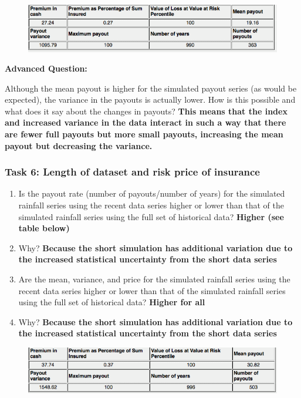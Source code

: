 \documentclass[letterpaper,10pt,english]{sphinxmanual}
\begin{document}
\begin{figure}[htbp]
\centering

\includegraphics{premium2.png}
\end{figure}

\textbf{Advanced Question:}

Although the mean payout is higher for the simulated payout series (as would be expected), the variance in the payouts is actually lower.  How is this possible and what does it say about the changes in payouts? \textbf{This means that the index and increased variance in the data interact in such a way that there are fewer full payouts but more small payouts, increasing the mean payout but decreasing the variance.}


\subsubsection{Task 6: Length of dataset and risk price of insurance}
\label{wiiet/wiiet_influenceshortdatasetsanskey:task-6-length-of-dataset-and-risk-price-of-insurance}\begin{enumerate}
\item {} 
Is the payout rate (number of payouts/number of years) for the simulated rainfall series using the recent data series higher or lower than that of the simulated rainfall series using the full set of historical data? \textbf{Higher (see table below)}

\item {} 
Why? \textbf{Because the short simulation has additional variation due to the increased statistical uncertainty from the short data series}

\item {} 
Are the mean, variance, and price for the simulated rainfall series using the recent data series higher or lower than that of the simulated rainfall series using the full set of historical data? \textbf{Higher for all}

\item {} 
Why? \textbf{Because the short simulation has additional variation due to the increased statistical uncertainty from the short data series}

\end{enumerate}
\begin{figure}[htbp]
\centering

\includegraphics{premium3.png}
\end{figure}
\end{document}
